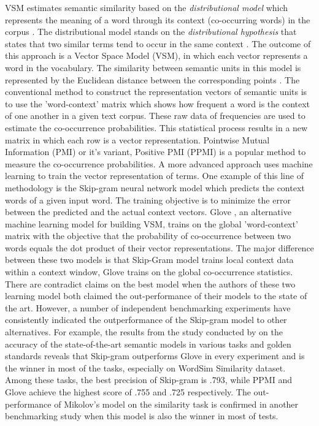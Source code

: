 \documentclass[Journal, BackFigs, DoubleSpace]{ascelike}%
\begin{document}
VSM estimates semantic similarity based on the \textit{distributional model} which represents the meaning of a word through its context (co-occurring words) in the corpus \cite{erk12}. The distributional model stands on the \textit{distributional hypothesis} that states that two similar terms tend to occur in the same context \cite{Harris54}. The outcome of this approach is a Vector Space Model (VSM), in which each vector represents a word in the vocabulary. The similarity between semantic units in this model is represented by the Euclidean distance between the corresponding points \cite{erk12}. The conventional method to construct the representation vectors of semantic units is to use the 'word-context' matrix which shows how frequent a word is the context of one another in a given text corpus. These raw data of frequencies are used to estimate the co-occurrence probabilities. This statistical process results in a new matrix in which each row is a vector representation. Pointwise Mutual Information (PMI) \cite{church90} or it's variant, Positive PMI (PPMI) is a popular method to measure the co-occurrence probabilities. A more advanced approach uses machine learning to train the vector representation of terms. One example of this line of methodology is the Skip-gram neural network model \cite{mikolov13a} which predicts the context words of a given input word. The training objective is to minimize the error between the predicted and the actual context vectors. Glove \cite{pennington2014glove}, an alternative machine learning model for building VSM, trains on the global 'word-context' matrix with the objective that the probability of co-occurrence between two words equals the dot product of their vector representations. The major difference between these two models is that Skip-Gram model trains local context data within a context window, Glove trains on the global co-occurrence statistics. There are contradict claims on the best model when the authors of these two learning model both claimed the out-performance of their models to the state of the art. However, a number of independent benchmarking experiments have consistently indicated the outperformance of the Skip-gram model to other alternatives. For example, the results from the study conducted by  on the accuracy of the state-of-the-art semantic models in various tasks and golden standards reveals that Skip-gram outperforms Glove in every experiment and is the winner in most of the tasks, especially on WordSim Similarity dataset. Among these tasks, the best precision of Skip-gram is .793, while PPMI and Glove achieve the highest score of .755 and .725 respectively.  The out-performance of Mikolov's model on the similarity task is confirmed in another benchmarking study \cite{hill15} when this model is also the winner in most of tests. 
\end{document}
